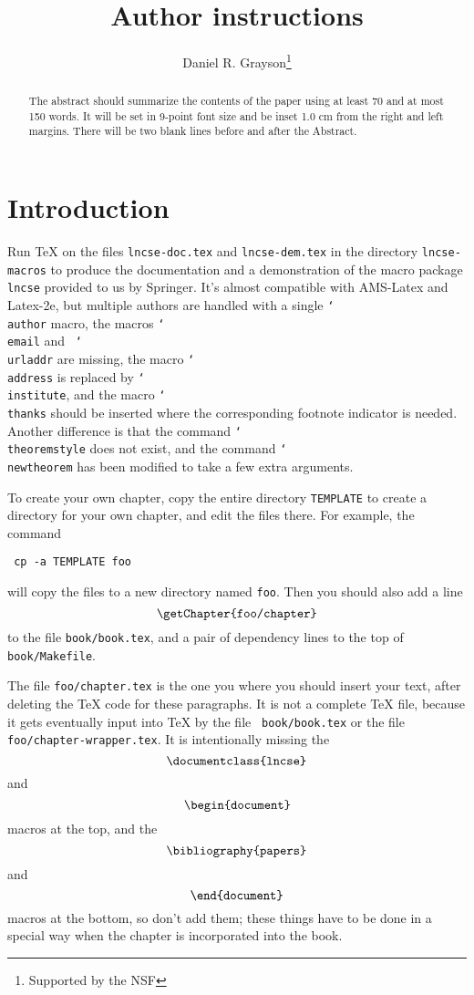 \title{Author instructions}
\author{Daniel R. Grayson\thanks{Supported by the NSF}}
\maketitle

\def\lll{{\tt\char`\<\char`\<\char`\<}}
\def\rrr{{\tt\char`\>\char`\>\char`\>}}
\def\slash{\char`\\}

\begin{abstract}
The abstract should summarize the contents of the paper
using at least 70 and at most 150 words. It will be set in 9-point
font size and be inset 1.0 cm from the right and left margins.
There will be two blank lines before and after the Abstract.
\end{abstract}

\section*{Introduction}
Run TeX on the files {\tt lncse-doc.tex} and {\tt lncse-dem.tex} in the
directory {\tt lncse-macros} to produce the documentation and a demonstration
of the macro package {\tt lncse} provided to us by Springer.  It's almost
compatible with AMS-Latex and Latex-2e, but multiple authors are handled with
a single {\tt \slash author} macro, the macros {\tt \slash email} and {\tt
  \slash urladdr} are missing, the macro {\tt \slash address} is replaced by
{\tt \slash institute}, and the macro {\tt \slash thanks} should be inserted
where the corresponding footnote indicator is needed.  Another difference is
that the command {\tt \slash theoremstyle} does not exist, and the command
{\tt \slash newtheorem} has been modified to take a few extra arguments.

To create your own chapter, copy the entire directory {\tt TEMPLATE} to
create a directory for your own chapter, and edit the files there.  For
example, the command
\par\smallskip
\centerline{\tt
cp -a TEMPLATE foo
}
\smallskip\noindent
will copy the files to a new directory named {\tt foo}.  Then you should also
add a line $$\text{\tt \slash getChapter\char`\{foo/chapter\char`\}}$$ to the file
{\tt book/book.tex}, and a pair of dependency lines to the top of {\tt
book/Makefile}.

The file {\tt foo/chapter.tex} is the one you where you should insert your
text, after deleting the TeX code for these paragraphs.  It is not a complete
TeX file, because it gets eventually input into TeX by the file {\tt
book/book.tex} or the file {\tt foo/chapter-wrapper.tex}.  It is
intentionally missing the $$\text{\tt \slash documentclass\char`\{lncse\char`\}}$$ and
$$\text{\tt \slash begin\char`\{document\char`\}}$$ macros at the top, and the
$$\text{\tt \slash bibliography\char`\{papers\char`\}}$$ and $$\text{\tt \slash
end\char`\{document\char`\}}$$ macros at the bottom, so don't add them; these things have
to be done in a special way when the chapter is incorporated into the book.

